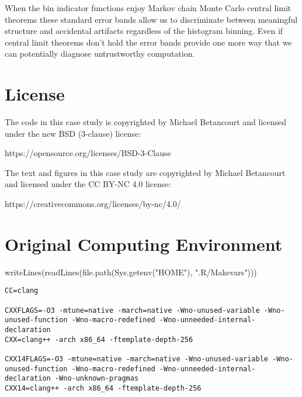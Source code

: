 \documentclass[
  letterpaper,
  DIV=11,
  numbers=noendperiod]{scrartcl}
\newenvironment{Shaded}{\begin{snugshade}}{\end{snugshade}}
\newcommand{\FunctionTok}[1]{\textcolor[rgb]{0.28,0.35,0.67}{#1}}
\newcommand{\NormalTok}[1]{\textcolor[rgb]{0.00,0.23,0.31}{#1}}
\newcommand{\StringTok}[1]{\textcolor[rgb]{0.13,0.47,0.30}{#1}}
\begin{document}
When the bin indicator functions enjoy Markov chain Monte Carlo central
limit theorems these standard error bands allow us to discriminate
between meaningful structure and accidental artifacts regardless of the
histogram binning. Even if central limit theorems don't hold the error
bands provide one more way that we can potentially diagnose
untrustworthy computation.

\hypertarget{license}{%
\section*{License}\label{license}}

The code in this case study is copyrighted by Michael Betancourt and
licensed under the new BSD (3-clause) license:

https://opensource.org/licenses/BSD-3-Clause

The text and figures in this case study are copyrighted by Michael
Betancourt and licensed under the CC BY-NC 4.0 license:

https://creativecommons.org/licenses/by-nc/4.0/

\hypertarget{original-computing-environment}{%
\section*{Original Computing
Environment}\label{original-computing-environment}}

\begin{Shaded}
\begin{Highlighting}[]
\FunctionTok{writeLines}\NormalTok{(}\FunctionTok{readLines}\NormalTok{(}\FunctionTok{file.path}\NormalTok{(}\FunctionTok{Sys.getenv}\NormalTok{(}\StringTok{"HOME"}\NormalTok{), }\StringTok{".R/Makevars"}\NormalTok{)))}
\end{Highlighting}
\end{Shaded}

\begin{verbatim}
CC=clang

CXXFLAGS=-O3 -mtune=native -march=native -Wno-unused-variable -Wno-unused-function -Wno-macro-redefined -Wno-unneeded-internal-declaration
CXX=clang++ -arch x86_64 -ftemplate-depth-256

CXX14FLAGS=-O3 -mtune=native -march=native -Wno-unused-variable -Wno-unused-function -Wno-macro-redefined -Wno-unneeded-internal-declaration -Wno-unknown-pragmas
CXX14=clang++ -arch x86_64 -ftemplate-depth-256
\end{verbatim}
\end{document}
